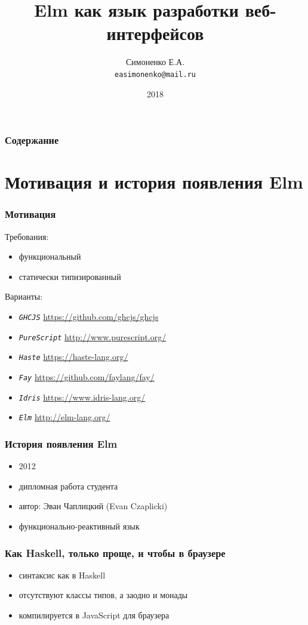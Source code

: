 \documentclass[11pt,aspectratio=169]{beamer}
\begin{document}
\author{Симоненко Е.А. \\ \texttt{easimonenko@mail.ru}}
\title{Elm как язык разработки веб-интерфейсов}
\date{2018}

\begin{frame}
\titlepage
\end{frame}

\begin{frame}
\frametitle{Содержание}
\tableofcontents
\end{frame}

\section{Мотивация и история появления Elm}

\begin{frame}
\frametitle{Мотивация}
Требования:
\begin{itemize}
	\item функциональный
	\item статически типизированный
\end{itemize}
Варианты:
\begin{itemize}
	\item \textit{\texttt{GHCJS}} \url{https://github.com/ghcjs/ghcjs}
	\item \textit{\texttt{PureScript}} \url{http://www.purescript.org/}
	\item \textit{\texttt{Haste}} \url{https://haste-lang.org/}
	\item \textit{\texttt{Fay}} \url{https://github.com/faylang/fay/}
	\item \textit{\texttt{Idris}} \url{https://www.idris-lang.org/}
	\item \textit{\texttt{Elm}} \url{http://elm-lang.org/}
\end{itemize}
\end{frame}

\begin{frame}
\frametitle{История появления Elm}
\begin{itemize}
	\item 2012
	\item дипломная работа студента
	\item автор: Эван Чаплицкий (Evan Czaplicki)
	\item функционально-реактивный язык
\end{itemize}
\end{frame}

\begin{frame}
\frametitle{Как Haskell, только проще, и чтобы в браузере}
\begin{itemize}
	\item синтаксис как в Haskell
	\item отсутствуют классы типов, а заодно и монады
	\item компилируется в JavaScript для браузера
\end{itemize}
\end{frame}
\end{document}
